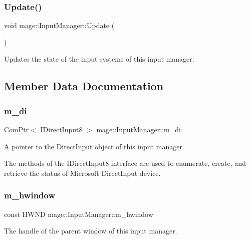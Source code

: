 \subsubsection{\texorpdfstring{Update()}{Update()}}
{\footnotesize\ttfamily void mage\+::\+Input\+Manager\+::\+Update (\begin{DoxyParamCaption}{ }\end{DoxyParamCaption})}

Updates the state of the input systems of this input manager. 

\subsection{Member Data Documentation}
\hypertarget{classmage_1_1_input_manager_a0ffbd0e68b5bab33c35f310625884f3a}{}\label{classmage_1_1_input_manager_a0ffbd0e68b5bab33c35f310625884f3a} 
\subsubsection{\texorpdfstring{m\+\_\+di}{m\_di}}
{\footnotesize\ttfamily \hyperlink{namespacemage_ae74f374780900893caa5555d1031fd79}{Com\+Ptr}$<$ I\+Direct\+Input8 $>$ mage\+::\+Input\+Manager\+::m\+\_\+di\hspace{0.3cm}{\ttfamily [private]}}

A pointer to the Direct\+Input object of this input manager.

The methods of the I\+Direct\+Input8 interface are used to enumerate, create, and retrieve the status of Microsoft Direct\+Input device. \hypertarget{classmage_1_1_input_manager_aebef4e7c7a12484cc68cd167ae2961bc}{}\label{classmage_1_1_input_manager_aebef4e7c7a12484cc68cd167ae2961bc} 
\subsubsection{\texorpdfstring{m\+\_\+hwindow}{m\_hwindow}}
{\footnotesize\ttfamily const H\+W\+ND mage\+::\+Input\+Manager\+::m\+\_\+hwindow\hspace{0.3cm}{\ttfamily [private]}}

The handle of the parent window of this input manager. \hypertarget{classmage_1_1_input_manager_a196bdd04e169e89d0fa5f6a4a180e4cb}{}\label{classmage_1_1_input_manager_a196bdd04e169e89d0fa5f6a4a180e4cb} 
